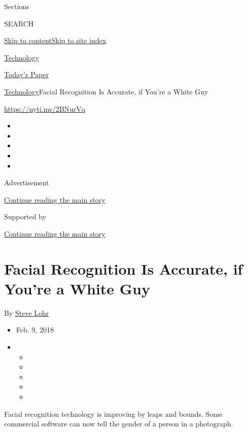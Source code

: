 Sections

SEARCH

\protect\hyperlink{site-content}{Skip to
content}\protect\hyperlink{site-index}{Skip to site index}

\href{https://www.nytimes.com/section/technology}{Technology}

\href{https://myaccount.nytimes.com/auth/login?response_type=cookie\&client_id=vi}{}

\href{https://www.nytimes.com/section/todayspaper}{Today's Paper}

\href{/section/technology}{Technology}\textbar{}Facial Recognition Is
Accurate, if You're a White Guy

\url{https://nyti.ms/2BNurVq}

\begin{itemize}
\item
\item
\item
\item
\item
\end{itemize}

Advertisement

\protect\hyperlink{after-top}{Continue reading the main story}

Supported by

\protect\hyperlink{after-sponsor}{Continue reading the main story}

\hypertarget{facial-recognition-is-accurate-if-youre-a-white-guy}{%
\section{Facial Recognition Is Accurate, if You're a White
Guy}\label{facial-recognition-is-accurate-if-youre-a-white-guy}}

By \href{http://www.nytimes.com/by/steve-lohr}{Steve Lohr}

\begin{itemize}
\item
  Feb. 9, 2018
\item
  \begin{itemize}
  \item
  \item
  \item
  \item
  \item
  \end{itemize}
\end{itemize}

Facial recognition technology is improving by leaps and bounds. Some
commercial software can now tell the gender of a person in a photograph.

